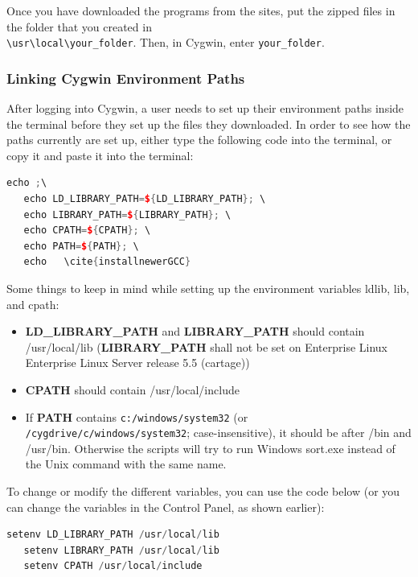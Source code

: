 Once you have downloaded the programs from the sites, put the zipped files in the folder that you created in \\ \texttt{\textbackslash{usr}\textbackslash{local}\textbackslash{your\_folder}}. Then, in Cygwin, enter \texttt{your\_folder}. 

	\subsubsection* {Linking Cygwin Environment Paths}
After logging into Cygwin, a user needs to set up their environment paths inside the terminal before they set up the files they downloaded. In order to see how the paths currently are set up, either type the following code into the terminal, or copy it and paste it into the terminal: 

\begin{center}\begin{minipage}{0.9\linewidth}

\begin{lstlisting}[language=c++, caption=Adapted from \cite{installnewerGCC}, captionpos=b]
   echo ;\
   echo LD_LIBRARY_PATH=${LD_LIBRARY_PATH}; \
   echo LIBRARY_PATH=${LIBRARY_PATH}; \
   echo CPATH=${CPATH}; \
   echo PATH=${PATH}; \
   echo   \cite{installnewerGCC}
\end{lstlisting}
\end{minipage}\end{center}

Some things to keep in mind while setting up the environment variables \gls{ldlib}, \gls{lib}, and \gls{cpath}:
\begin{itemize}
\item \textbf{LD\_LIBRARY\_PATH} and \textbf{LIBRARY\_PATH} should contain /usr/local/lib (\textbf{LIBRARY\_PATH} shall not be set on Enterprise Linux Enterprise Linux Server release 5.5 (cartage)) 
\item \textbf{CPATH} should contain /usr/local/include
\item If \textbf{PATH} contains \texttt{c:/windows/system32} (or \texttt{/cygdrive/c/windows/system32}; case-insensitive), it should be after /bin and /usr/bin. Otherwise the scripts will try to run Windows sort.exe instead of the Unix command with the same name.
\end{itemize}

To change or modify the different variables, you can use the code below (or you can change the variables in the Control Panel, as shown earlier): 
\begin{center}\begin{minipage}{0.9\linewidth}

\begin{lstlisting}[language=c++, caption=Adapted from \cite{installnewerGCC}, captionpos=b]
   setenv LD_LIBRARY_PATH /usr/local/lib
   setenv LIBRARY_PATH /usr/local/lib
   setenv CPATH /usr/local/include
\end{lstlisting}
\end{minipage}\end{center}

